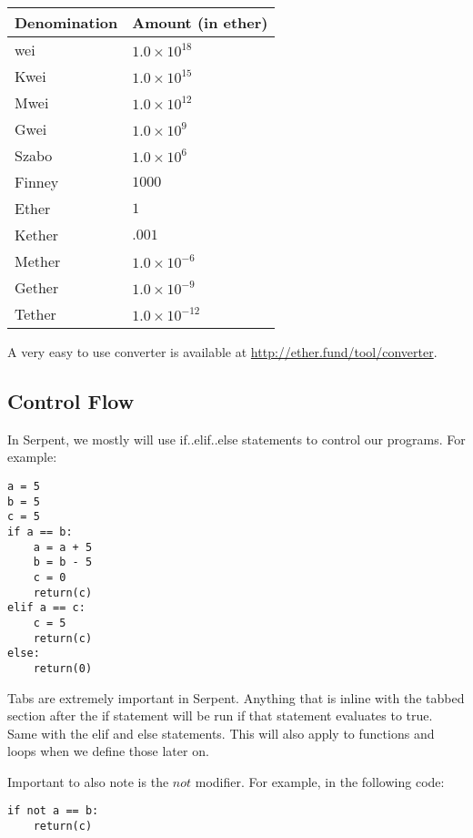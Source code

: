 \documentclass[12pt]{article}
\begin{document}
\begin{center}
	\begin{tabular}{| l | p{3.5cm} |}
	\hline
	Denomination & Amount (in ether) \\ \hline
	wei & $1.0 \times 10^{18}$ \\ \hline
	Kwei & $1.0 \times 10^{15}$ \\ \hline
	Mwei & $1.0 \times 10^{12}$ \\ \hline
	Gwei & $1.0 \times 10^{9}$ \\ \hline
	Szabo & $1.0 \times 10^{6}$ \\ \hline
	Finney & $1000$ \\ \hline
	Ether & $1$ \\ \hline
	Kether & $.001$ \\ \hline
	Mether & $1.0 \times 10^{-6}$ \\ \hline
	Gether & $1.0 \times 10^{-9}$ \\ \hline
	Tether & $1.0 \times 10^{-12}$ \\ \hline
	\end{tabular}
\end{center}

A very easy to use converter is available at \url{http://ether.fund/tool/converter}. 

\subsection{Control Flow}

	In Serpent, we mostly will use if..elif..else statements to control our programs. For example:
	
\begin{verbatim}
a = 5
b = 5
c = 5
if a == b:
	a = a + 5
	b = b - 5
	c = 0
	return(c)
elif a == c: 
	c = 5
	return(c)
else:
	return(0)
\end{verbatim}

	Tabs are extremely important in Serpent. Anything that is inline with the tabbed section after the if statement will be run if that statement evaluates to true. Same with the elif and else statements. This will also apply to functions and loops when we define those later on. \cite{Serpent}
	
	Important to also note is the $not$ modifier. For example, in the following code:
	
\begin{verbatim}
if not a == b:
	return(c)
\end{verbatim}
\end{document}
